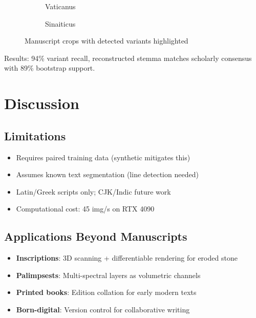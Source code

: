 \documentclass[12pt,a4paper]{article}
\begin{document}
\begin{figure}[htbp]
\centering
\begin{subfigure}[b]{0.48\linewidth}
\centering
{}
\caption{Vaticanus}\label{subfig:vat}
\end{subfigure}
\hfill
\begin{subfigure}[b]{0.48\linewidth}
\centering
{}
\caption{Sinaiticus}\label{subfig:sin}
\end{subfigure}
\caption{Manuscript crops with detected variants highlighted}\label{fig:manuscripts}
\end{figure}

Results: 94\% variant recall, reconstructed stemma matches
scholarly consensus with 89\% bootstrap support.

\section{Discussion}
\label{sec:discussion}

\subsection{Limitations}
\label{sec:limitations}

\begin{itemize}
    \item Requires paired training data (synthetic mitigates this)
    \item Assumes known text segmentation (line detection needed)
    \item Latin/Greek scripts only; CJK/Indic future work
    \item Computational cost: 45 img/s on RTX 4090
\end{itemize}

\subsection{Applications Beyond Manuscripts}
\label{sec:applications}

\begin{itemize}
    \item \textbf{Inscriptions}: 3D scanning + differentiable rendering for eroded stone
    \item \textbf{Palimpsests}: Multi-spectral layers as volumetric channels
    \item \textbf{Printed books}: Edition collation for early modern texts
    \item \textbf{Born-digital}: Version control for collaborative writing
\end{itemize}
\end{document}
